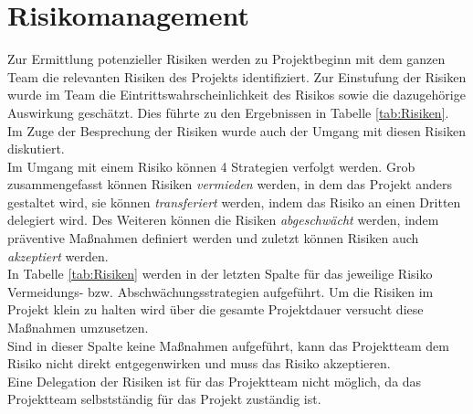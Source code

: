 \chapter{Risikomanagement}

Zur Ermittlung potenzieller Risiken werden zu Projektbeginn mit dem ganzen Team die relevanten Risiken des Projekts identifiziert. Zur Einstufung der Risiken wurde im Team die Eintrittswahrscheinlichkeit des Risikos sowie die dazugehörige Auswirkung geschätzt. Dies führte zu den Ergebnissen in Tabelle \ref{tab:Risiken}. Im Zuge der Besprechung der Risiken wurde auch der Umgang mit diesen Risiken diskutiert. \\
Im Umgang mit einem Risiko können 4 Strategien verfolgt werden. Grob zusammengefasst können Risiken \textit{vermieden} werden, in dem das Projekt anders gestaltet wird, sie können \textit{transferiert} werden, indem das Risiko an einen Dritten delegiert wird. Des Weiteren können die Risiken \textit{abgeschwächt} werden, indem präventive Maßnahmen definiert werden und zuletzt können Risiken auch \textit{akzeptiert} werden. \\
In Tabelle \ref{tab:Risiken} werden in der letzten Spalte für das jeweilige Risiko Vermeidungs- bzw. Abschwächungsstrategien aufgeführt. Um die Risiken im Projekt klein zu halten wird über die gesamte Projektdauer versucht diese Maßnahmen umzusetzen. \\ 
Sind in dieser Spalte keine Maßnahmen aufgeführt, kann das Projektteam dem Risiko nicht direkt entgegenwirken und muss das Risiko akzeptieren. \\
Eine Delegation der Risiken ist für das Projektteam nicht möglich, da das Projektteam selbstständig für das Projekt zuständig ist.

